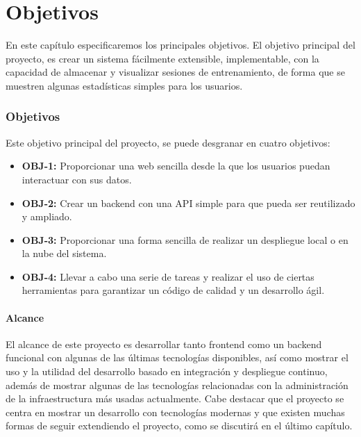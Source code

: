 \chapter{Objetivos}

En este capítulo especificaremos los principales objetivos. El objetivo principal del proyecto,
es crear un sistema fácilmente extensible, implementable, con la capacidad de almacenar y visualizar sesiones de entrenamiento, de forma que se muestren algunas
estadísticas simples para los usuarios. 

\subsection{Objetivos}
Este objetivo principal del proyecto, se puede desgranar en cuatro objetivos:

\begin{itemize}
  \item \textbf{OBJ-1:} Proporcionar una web sencilla desde la que los usuarios puedan interactuar con sus datos.
  \item \textbf{OBJ-2:} Crear un backend con una API simple para que pueda ser reutilizado y ampliado.
  \item \textbf{OBJ-3:} Proporcionar una forma sencilla de realizar un despliegue local o en la nube del sistema.
  \item \textbf{OBJ-4:} Llevar a cabo una serie de tareas y realizar el uso de ciertas herramientas para garantizar un código de calidad y un desarrollo ágil.
\end{itemize}

\subsubsection{Alcance}
El alcance de este proyecto es desarrollar tanto frontend como un backend funcional con algunas de las últimas tecnologías disponibles,
así como mostrar el uso y la utilidad del desarrollo basado en integración y despliegue continuo, además de mostrar algunas de 
las tecnologías relacionadas con la administración de la infraestructura más usadas actualmente. Cabe destacar que el proyecto se centra
en mostrar un desarrollo con tecnologías modernas y que existen muchas formas de seguir extendiendo el proyecto, como se discutirá en el 
último capítulo.


